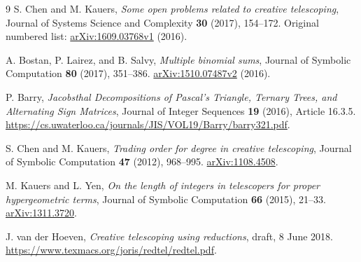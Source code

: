 \documentclass[11pt,a4paper]{article}
\theoremstyle{remark}\newtheorem{remark}[theorem]{Remark}
\begin{document}
\begin{thebibliography}{9}
S. Chen and M. Kauers,
\emph{Some open problems related to creative telescoping},
Journal of Systems Science and Complexity \textbf{30} (2017), 154--172.
Original numbered list: \href{https://arxiv.org/abs/1609.03768}{arXiv:1609.03768v1} (2016).

A. Bostan, P. Lairez, and B. Salvy,
\emph{Multiple binomial sums},
Journal of Symbolic Computation \textbf{80} (2017), 351--386.
\href{https://arxiv.org/abs/1510.07487}{arXiv:1510.07487v2} (2016).

P. Barry,
\emph{Jacobsthal Decompositions of Pascal's Triangle, Ternary Trees,
and Alternating Sign Matrices},
Journal of Integer Sequences \textbf{19} (2016), Article 16.3.5.
\url{https://cs.uwaterloo.ca/journals/JIS/VOL19/Barry/barry321.pdf}.

S. Chen and M. Kauers,
\emph{Trading order for degree in creative telescoping},
Journal of Symbolic Computation \textbf{47} (2012), 968--995.
\href{https://arxiv.org/abs/1108.4508}{arXiv:1108.4508}.

M. Kauers and L. Yen,
\emph{On the length of integers in telescopers for proper hypergeometric terms},
Journal of Symbolic Computation \textbf{66} (2015), 21--33.
\href{https://arxiv.org/abs/1311.3720}{arXiv:1311.3720}.

J. van der Hoeven,
\emph{Creative telescoping using reductions}, draft, 8 June 2018.
\url{https://www.texmacs.org/joris/redtel/redtel.pdf}.
\end{thebibliography}
\end{document}
